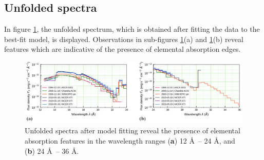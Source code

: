     \subsection{Unfolded spectra}
    In figure \ref{fig:all-uf}, the unfolded spectrum, which is obtained after fitting the data to the best-fit model, is displayed. Observations in sub-figures \ref{fig:all-uf}(a) and \ref{fig:all-uf}(b) reveal features which are indicative of the presence of elemental absorption edges.
    
    \begin{figure}[!htb]
        \centering
        \includegraphics[width=\textwidth]{figures/eufspec/mr-vel-uf_all-obs}
        \caption{Unfolded spectra after model fitting reveal the presence of elemental absorption features in the wavelength ranges (\textbf{a}) 12 \AA\ -- 24 \AA, and (\textbf{b}) 24 \AA\ -- 36 \AA.}
        \label{fig:all-uf}
    \end{figure}
    
    
